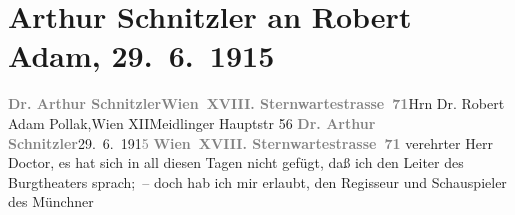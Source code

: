 

         
         \renewcommand{\erwaehntePersonen}{Personen: Robert Adam, Albert Steinrück, Hugo Thimig}
         \renewcommand{\erwaehnteInstitutionen}{Institutionen: Nationaltheater München}
         \renewcommand{\erwaehnteOrte}{Orte: Burgtheater, Meidlinger Hauptstraße, Sternwartestraße 71, Villa Annerl, Villa Zufriedenheit, Wien, XII., Meidling}
         \renewcommand{\erwaehnteWerke}{Werke: Der Fremde, Die Geschichte des Alî ibn Bekkâr mit Schams an-Nahâr, Fatme}
               \section[Arthur Schnitzler an Robert Adam, 29. 6. 1915]{ Arthur Schnitzler an Robert Adam, 29. 6. 1915}\nopagebreak{}\rehead{ }\begin{ledgroupsized}[t]{13cm}\normalsize\beginnumbering{} \toendnotes[C]{\smallbreak\pagebreak[2]} 
\toendnotes[C]{\smallbreak}\pstart{}{\pb}\textcolor{gray}{\textbf{Dr. Arthur Schnitzler}}\pend{}\pstart{}\textcolor{gray}{\textbf{Wien XVIII. Sternwartestrasse 71}}\pend{}{\bigskip}\pstart{}{\pb}Hrn Dr. Robert Adam Pollak,\pend{}\pstart{}Wien XII\pend{}\pstart{}Meidlinger Hauptstr 56\pend{}{\bigskip}\pstart
           \noindent{}{\pb}\textcolor{gray}{\textbf{Dr. Arthur Schnitzler}}\hfill 29. 6. 191\textcolor{gray}{5}\pend
           \pstart
           \textcolor{gray}{\textbf{Wien XVIII. Sternwartestrasse 71}}\pend
           \pstart
           verehrter Herr Doctor, es hat sich in all diesen Tagen nicht gefügt,
               daß ich den Leiter des Burgtheaters sprach; – doch hab ich mir erlaubt,
               den Regisseur und Schauspieler des Münchner

\end{ledgroupsized}
